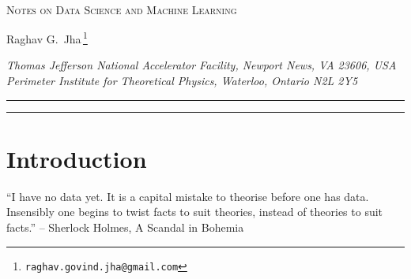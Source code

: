 \documentclass[11pt]{article}
\begin{document}
	\begin{titlepage}
		\setcounter{page}{1} \baselineskip=15.5pt \thispagestyle{empty}
		\bigskip\
		\vspace{1cm}
		\begin{center}
			{\fontsize{19}{38}\textsc{Notes on Data Science and Machine Learning}}  %
		\end{center}
		\vspace{0.2cm}
		\begin{center}
			{\fontsize{12}{30}\selectfont Raghav G.~Jha\orcidA{}\,\footnote{\texttt{raghav.govind.jha@gmail.com}}}
		\end{center}
		
		
		\begin{center}
			\vskip 7pt
			\textsl{Thomas Jefferson National Accelerator Facility, Newport News, VA 23606, USA\\
			Perimeter Institute for Theoretical Physics, Waterloo, Ontario N2L 2Y5\\
				}
			\vskip 6pt
		\end{center}
		
		\vspace{2.6cm}
		\hrule \vspace{0.2cm}
\vspace{0.5cm}
\hrule

\vspace{0.5cm}		
		\tableofcontents
		\vspace{0.6cm}
	\end{titlepage}
	
	
	\section{Introduction}
	
	\begin{mdframed}[backgroundcolor=celadon!20]
``I have no data yet. It is a capital mistake to theorise before one has data. Insensibly one begins to twist facts to suit theories, instead of theories to suit facts.'' -- 
	Sherlock Holmes, A Scandal in Bohemia
\end{mdframed}
	
\end{document}
